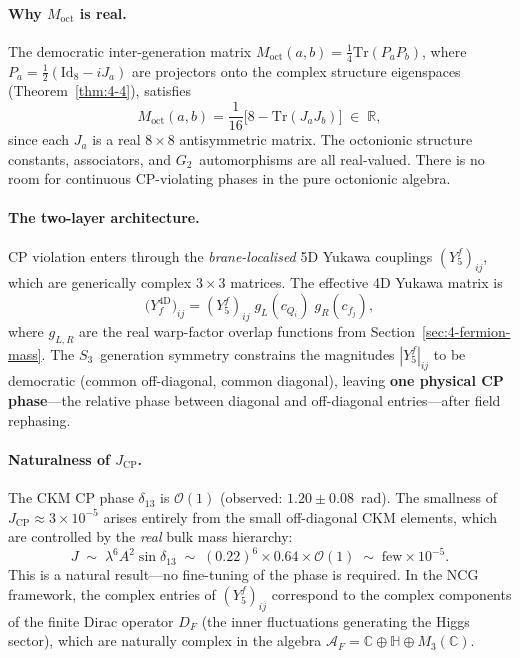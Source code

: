 \paragraph{Why $M_{\mathrm{oct}}$ is real.}
The democratic inter-generation matrix $M_{\mathrm{oct}}(a,b) = \tfrac{1}{4}\mathrm{Tr}(P_a P_b)$, where $P_a = \tfrac{1}{2}(\mathrm{Id}_8 - iJ_a)$ are projectors onto the complex structure eigenspaces (Theorem~\ref{thm:4-4}), satisfies
\begin{equation}
  M_{\mathrm{oct}}(a,b) = \frac{1}{16}\bigl[8 - \mathrm{Tr}(J_a J_b)\bigr] \;\in\; \mathbb{R},
  \label{eq:4-Moct-real}
\end{equation}
since each $J_a$ is a real $8 \times 8$ antisymmetric matrix.  The octonionic structure constants, associators, and $G_2$~automorphisms are all real-valued.  There is no room for continuous CP-violating phases in the pure octonionic algebra.

\paragraph{The two-layer architecture.}
CP violation enters through the \emph{brane-localised} 5D Yukawa couplings $(Y_5^f)_{ij}$, which are generically complex $3 \times 3$ matrices.  The effective 4D Yukawa matrix is
\begin{equation}
  \bigl(Y_f^{\mathrm{4D}}\bigr)_{ij}
  = (Y_5^f)_{ij}\; g_L(c_{Q_i})\; g_R(c_{f_j}),
  \label{eq:4-Y4D-complex}
\end{equation}
where $g_{L,R}$ are the real warp-factor overlap functions from Section~\ref{sec:4-fermion-mass}.  The $S_3$~generation symmetry constrains the magnitudes $|Y_5^f|_{ij}$ to be democratic (common off-diagonal, common diagonal), leaving \textbf{one physical CP phase}---the relative phase between diagonal and off-diagonal entries---after field rephasing.

\paragraph{Naturalness of $J_{\mathrm{CP}}$.}
The CKM CP phase $\delta_{13}$ is $\mathcal{O}(1)$ (observed: $1.20 \pm 0.08$~rad).  The smallness of $J_{\mathrm{CP}} \approx 3 \times 10^{-5}$ arises entirely from the small off-diagonal CKM elements, which are controlled by the \emph{real} bulk mass hierarchy:
\begin{equation}
  J \;\sim\; \lambda^6 A^2 \sin\delta_{13}
  \;\sim\; (0.22)^6 \times 0.64 \times \mathcal{O}(1)
  \;\sim\; \text{few} \times 10^{-5}.
  \label{eq:4-JCP-estimate}
\end{equation}
This is a natural result---no fine-tuning of the phase is required.  In the NCG framework, the complex entries of $(Y_5^f)_{ij}$ correspond to the complex components of the finite Dirac operator $D_F$ (the inner fluctuations generating the Higgs sector), which are naturally complex in the algebra $\mathcal{A}_F = \mathbb{C} \oplus \mathbb{H} \oplus M_3(\mathbb{C})$.

